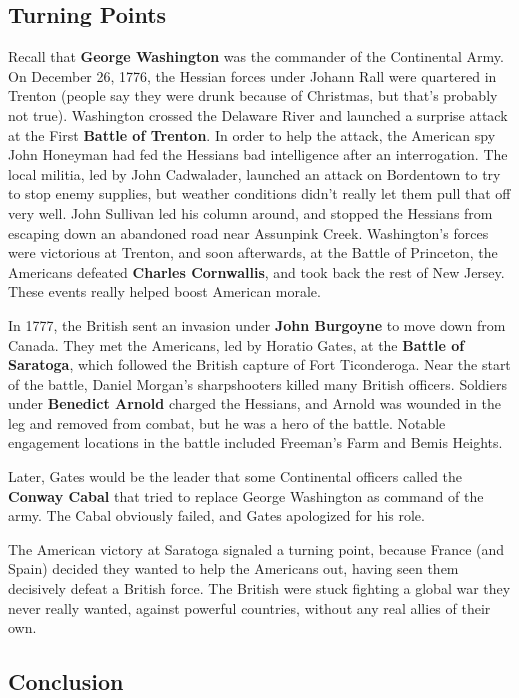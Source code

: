 \subsection*{Turning Points}

Recall that \textbf{George Washington} was the commander of the Continental Army.
On December 26, 1776, the Hessian forces under Johann Rall were quartered in Trenton
(people say they were drunk because of Christmas, but that's probably not true).
Washington crossed the Delaware River and launched a surprise attack at the First \textbf{Battle of Trenton}.
In order to help the attack,
the American spy John Honeyman had fed the Hessians bad intelligence after an interrogation.
The local militia, led by John Cadwalader, launched an attack on Bordentown to try to stop enemy supplies,
but weather conditions didn't really let them pull that off very well.
John Sullivan led his column around,
and stopped the Hessians from escaping down an abandoned road near Assunpink Creek.
Washington's forces were victorious at Trenton,
and soon afterwards, at the Battle of Princeton, the Americans defeated \textbf{Charles Cornwallis},
and took back the rest of New Jersey.
These events really helped boost American morale.

In 1777, the British sent an invasion under \textbf{John Burgoyne} to move down from Canada.
They met the Americans, led by Horatio Gates, at the \textbf{Battle of Saratoga},
which followed the British capture of Fort Ticonderoga.
Near the start of the battle, Daniel Morgan's sharpshooters killed many British officers.
Soldiers under \textbf{Benedict Arnold} charged the Hessians,
and Arnold was wounded in the leg and removed from combat, but he was a hero of the battle.
Notable engagement locations in the battle included Freeman's Farm and Bemis Heights.

Later, Gates would be the leader that some Continental officers called the \textbf{Conway Cabal}
that tried to replace George Washington as command of the army.
The Cabal obviously failed, and Gates apologized for his role.

The American victory at Saratoga signaled a turning point,
because France (and Spain) decided they wanted to help the Americans out,
having seen them decisively defeat a British force.
The British were stuck fighting a global war they never really wanted,
against powerful countries, without any real allies of their own.

\subsection*{Conclusion}

